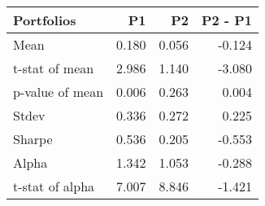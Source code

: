 \begin{tabular}{lrrr}
\toprule
Portfolios & P1 & P2 & P2 - P1 \\
\midrule
Mean & 0.180 & 0.056 & -0.124 \\
t-stat of mean & 2.986 & 1.140 & -3.080 \\
p-value of mean & 0.006 & 0.263 & 0.004 \\
Stdev & 0.336 & 0.272 & 0.225 \\
Sharpe & 0.536 & 0.205 & -0.553 \\
Alpha & 1.342 & 1.053 & -0.288 \\
t-stat of alpha & 7.007 & 8.846 & -1.421 \\
\bottomrule
\end{tabular}
